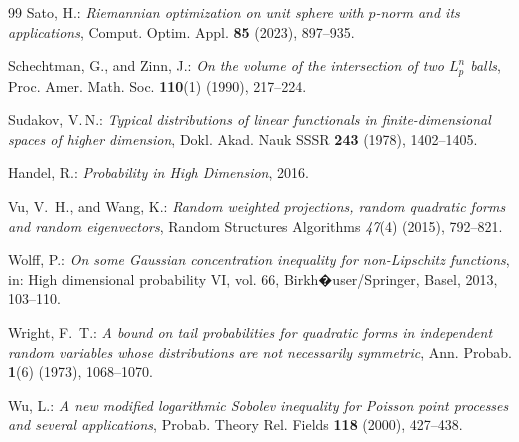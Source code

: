 \documentclass[a4paper,12pt]{amsart}
\numberwithin{equation}{section}
\theoremstyle{remark}
\begin{document}
\begin{thebibliography}{99}
	 Sato, H.: \emph{Riemannian optimization on unit sphere with $p$-norm and its applications}, Comput. Optim. Appl. \textbf{85} (2023), 897--935.
	
	 Schechtman, G., and Zinn, J.: \emph{On the volume of the intersection of two $L_p^n$ balls}, Proc. Amer. Math. Soc. \textbf{110}(1) (1990), 217--224.
	
	 Sudakov, V.\,N.: \emph{Typical distributions of linear functionals in finite-dimensional spaces of higher dimension},  Dokl. Akad. Nauk SSSR \textbf{243} (1978), 1402--1405.
	
	 Handel, R.: \emph{Probability in High Dimension}, 2016.
	
	 Vu, V.\, H., and Wang, K.: \emph{Random weighted projections, random quadratic forms and random eigenvectors}, Random Structures Algorithms \emph{47}(4) (2015), 792--821.
	
	 Wolff, P.: \emph{On some Gaussian concentration inequality for non-Lipschitz functions}, in: High dimensional probability VI, vol. 66, Birkh�user/Springer, Basel, 2013, 103--110.
	
	 Wright, F.\, T.: \emph{A bound on tail probabilities for quadratic forms in independent random variables whose distributions are not necessarily symmetric}, Ann. Probab. \textbf{1}(6) (1973), 1068--1070.
	
	 Wu, L.: \emph{A new modified logarithmic Sobolev inequality for Poisson point processes and several applications}, Probab. Theory Rel. Fields \textbf{118} (2000), 427--438.
	
\end{thebibliography}
	
\end{document}
